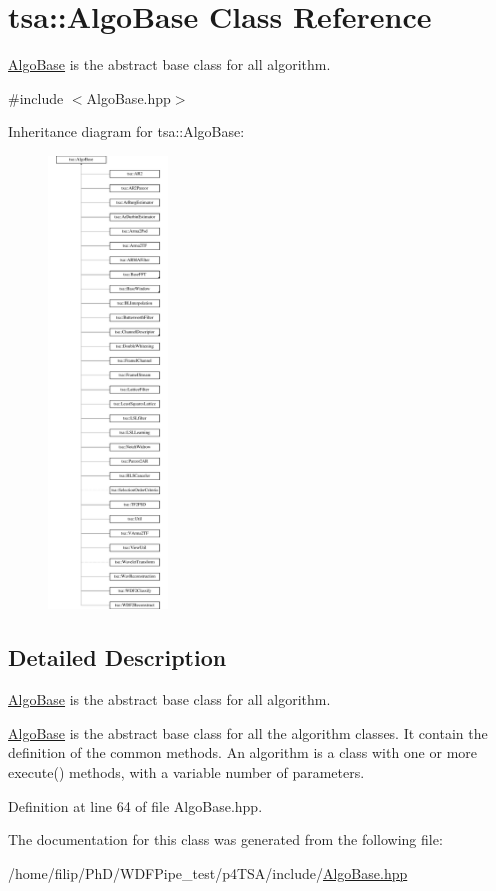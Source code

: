 \hypertarget{classtsa_1_1_algo_base}{}\section{tsa\+:\+:Algo\+Base Class Reference}
\label{classtsa_1_1_algo_base}


\hyperlink{classtsa_1_1_algo_base}{Algo\+Base} is the abstract base class for all algorithm.  




{\ttfamily \#include $<$Algo\+Base.\+hpp$>$}

Inheritance diagram for tsa\+:\+:Algo\+Base\+:\begin{figure}[H]
\begin{center}
\leavevmode
\includegraphics[height=12.000000cm]{classtsa_1_1_algo_base}
\end{center}
\end{figure}


\subsection{Detailed Description}
\hyperlink{classtsa_1_1_algo_base}{Algo\+Base} is the abstract base class for all algorithm. 

\hyperlink{classtsa_1_1_algo_base}{Algo\+Base} is the abstract base class for all the algorithm classes. It contain the definition of the common methods. An algorithm is a class with one or more execute() methods, with a variable number of parameters. 

Definition at line 64 of file Algo\+Base.\+hpp.



The documentation for this class was generated from the following file\+:\begin{DoxyCompactItemize}
\item 
/home/filip/\+Ph\+D/\+W\+D\+F\+Pipe\+\_\+test/p4\+T\+S\+A/include/\hyperlink{_algo_base_8hpp}{Algo\+Base.\+hpp}\end{DoxyCompactItemize}
